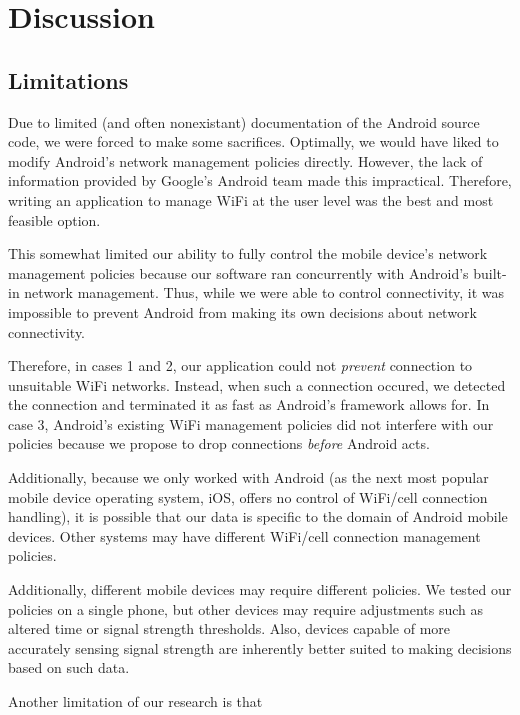 \section{Discussion}
\label{sec:disc}


\subsection{Limitations}

Due to limited (and often nonexistant) documentation of the Android source code, we were forced to make some sacrifices. Optimally, we would have liked to modify Android's network management policies directly. However, the lack of information provided by Google's Android team made this impractical. Therefore, writing an application to manage WiFi at the user level was the best and most feasible option.

This somewhat limited our ability to fully control the mobile device's network management policies because our software ran concurrently with Android's built-in network management. Thus, while we were able to control connectivity, it was impossible to prevent Android from making its own decisions about network connectivity.

Therefore, in cases 1 and 2, our application could not \emph{prevent} connection to unsuitable WiFi networks. Instead, when such a connection occured, we detected the connection and terminated it as fast as Android's framework allows for. In case 3, Android's existing WiFi management policies did not interfere with our policies because we propose to drop connections \emph{before} Android acts.

Additionally, because we only worked with Android (as the next most popular mobile device operating system, iOS, offers no control of WiFi/cell connection handling), it is possible that our data is specific to the domain of Android mobile devices. Other systems may have different WiFi/cell connection management policies.

Additionally, different mobile devices may require different policies. We tested our policies on a single phone, but other devices may require adjustments such as altered time or signal strength thresholds. Also, devices capable of more accurately sensing signal strength are inherently better suited to making decisions based on such data.

Another limitation of our research is that 
